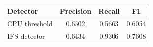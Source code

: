 \begin{tabular}{lccc}
\toprule
Detector & Precision & Recall & F1 \\
\midrule
CPU threshold & 0.6502 & 0.5663 & 0.6054 \\
IFS detector & 0.6434 & 0.9306 & 0.7608 \\
\bottomrule
\end{tabular}

